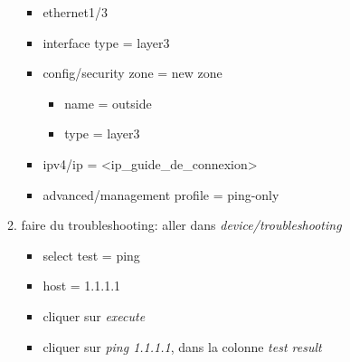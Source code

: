 \documentclass[a4paper]{article}
\begin{document}
\begin{enumerate}
\begin{enumerate}
\begin{example}
\begin{itemize}
    \end{itemize} \end{example}
    \begin{example} \begin{itemize}
        \item ethernet1/3
        \item interface type = layer3
        \item config/security zone = new zone
        \begin{example} \begin{itemize}
            \item name = outside
            \item type = layer3
        \end{itemize} \end{example}
        \item ipv4/ip = <ip\_guide\_de\_connexion>
        \item advanced/management profile = ping-only
    \end{itemize} \end{example}
    \item faire du troubleshooting: aller dans \textit{device/troubleshooting}
    \begin{itemize}
        \item select test = ping
        \item host = 1.1.1.1
        \item cliquer sur \textit{execute}
        \item cliquer sur \textit{ping 1.1.1.1}, dans la colonne \textit{test result}
    \end{itemize}
\end{enumerate}



\end{enumerate}
\end{document}
